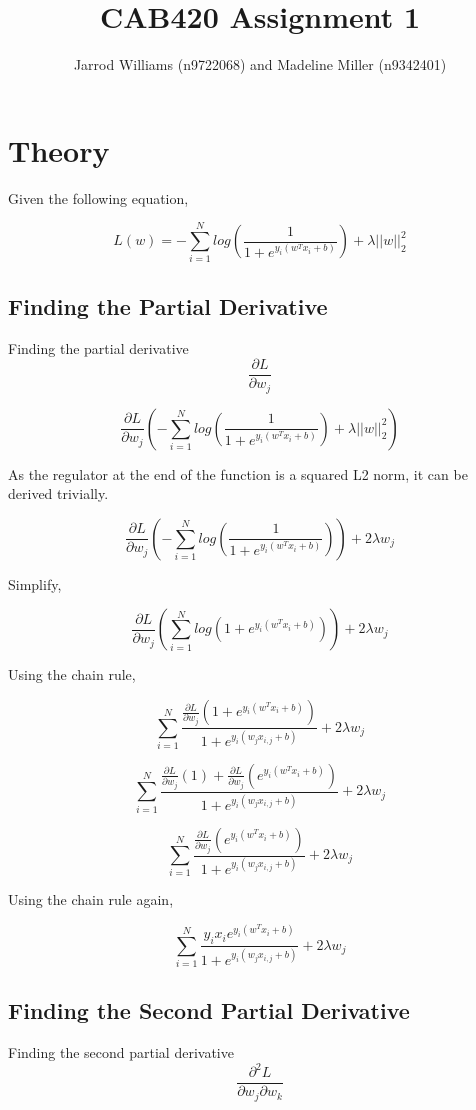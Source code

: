 \documentclass[]{report}   %
\begin{document}
\title{CAB420 Assignment 1}   %
\author{Jarrod Williams (n9722068) and Madeline Miller (n9342401)}         %
\maketitle

\chapter{Theory}

Given the following equation,

$$L(w)=-\sum_{i=1}^{N}log(\frac{1}{1+e^{y_i(w^Tx_i+b)}})+\lambda||w||_2^2$$

\section{Finding the Partial Derivative}
Finding the partial derivative $$\frac{\partial L}{\partial w_j}$$

$$\frac{\partial L}{\partial w_j}(-\sum_{i=1}^{N}log(\frac{1}{1+e^{y_i(w^Tx_i+b)}})+\lambda||w||_2^2)$$

As the regulator at the end of the function is a squared L2 norm, it can be derived trivially.

$$\frac{\partial L}{\partial w_j}(-\sum_{i=1}^{N}log(\frac{1}{1+e^{y_i(w^Tx_i+b)}}))+2\lambda w_j$$

Simplify,

$$\frac{\partial L}{\partial w_j}(\sum_{i=1}^{N}log(1+e^{y_i(w^Tx_i+b)}))+2\lambda w_j$$

Using the chain rule,

$$\sum_{i=1}^{N}\frac{\frac{\partial L}{\partial w_j}(1+e^{y_i(w^Tx_i+b)})}{1+e^{y_i(w_jx_{i,j}+b)}}+2\lambda w_j$$

$$\sum_{i=1}^{N}\frac{\frac{\partial L}{\partial w_j}(1)+\frac{\partial L}{\partial w_j}(e^{y_i(w^Tx_i+b)})}{1+e^{y_i(w_jx_{i,j}+b)}}+2\lambda w_j$$

$$\sum_{i=1}^{N}\frac{\frac{\partial L}{\partial w_j}(e^{y_i(w^Tx_i+b)})}{1+e^{y_i(w_jx_{i,j}+b)}}+2\lambda w_j$$

Using the chain rule again,

$$\sum_{i=1}^{N}\frac{y_ix_ie^{y_i(w^Tx_i+b)}}{1+e^{y_i(w_jx_{i,j}+b)}}+2\lambda w_j$$

\section{Finding the Second Partial Derivative}
Finding the second partial derivative $$\frac{\partial^2 L}{\partial w_j\partial w_k}$$
\end{document}

